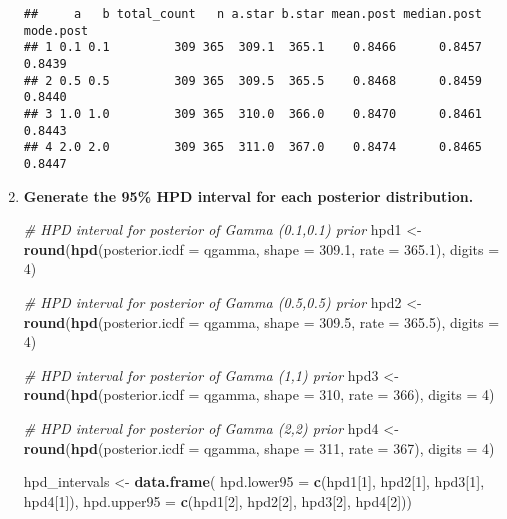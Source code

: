 \documentclass[]{article}
\newenvironment{Shaded}{\begin{snugshade}}{\end{snugshade}}
\newcommand{\AttributeTok}[1]{\textcolor[rgb]{0.13,0.29,0.53}{#1}}
\newcommand{\CommentTok}[1]{\textcolor[rgb]{0.56,0.35,0.01}{\textit{#1}}}
\newcommand{\DecValTok}[1]{\textcolor[rgb]{0.00,0.00,0.81}{#1}}
\newcommand{\FloatTok}[1]{\textcolor[rgb]{0.00,0.00,0.81}{#1}}
\newcommand{\FunctionTok}[1]{\textcolor[rgb]{0.13,0.29,0.53}{\textbf{#1}}}
\newcommand{\NormalTok}[1]{#1}
\newcommand{\OtherTok}[1]{\textcolor[rgb]{0.56,0.35,0.01}{#1}}
\begin{document}
\begin{enumerate}
\begin{verbatim}
##     a   b total_count   n a.star b.star mean.post median.post mode.post
## 1 0.1 0.1         309 365  309.1  365.1    0.8466      0.8457    0.8439
## 2 0.5 0.5         309 365  309.5  365.5    0.8468      0.8459    0.8440
## 3 1.0 1.0         309 365  310.0  366.0    0.8470      0.8461    0.8443
## 4 2.0 2.0         309 365  311.0  367.0    0.8474      0.8465    0.8447
\end{verbatim}

\hfill

\item \textbf{Generate the 95\% HPD interval for each posterior distribution.}

\begin{Shaded}
\begin{Highlighting}[]
\CommentTok{\# HPD interval for posterior of Gamma (0.1,0.1) prior}
\NormalTok{hpd1 }\OtherTok{\textless{}{-}} \FunctionTok{round}\NormalTok{(}\FunctionTok{hpd}\NormalTok{(}\AttributeTok{posterior.icdf =}\NormalTok{ qgamma, }\AttributeTok{shape =} \FloatTok{309.1}\NormalTok{, }\AttributeTok{rate =} \FloatTok{365.1}\NormalTok{), }
    \AttributeTok{digits =} \DecValTok{4}\NormalTok{)}

\CommentTok{\# HPD interval for posterior of Gamma (0.5,0.5) prior}
\NormalTok{hpd2 }\OtherTok{\textless{}{-}} \FunctionTok{round}\NormalTok{(}\FunctionTok{hpd}\NormalTok{(}\AttributeTok{posterior.icdf =}\NormalTok{ qgamma, }\AttributeTok{shape =} \FloatTok{309.5}\NormalTok{, }\AttributeTok{rate =} \FloatTok{365.5}\NormalTok{), }
    \AttributeTok{digits =} \DecValTok{4}\NormalTok{)}

\CommentTok{\# HPD interval for posterior of Gamma (1,1) prior}
\NormalTok{hpd3 }\OtherTok{\textless{}{-}} \FunctionTok{round}\NormalTok{(}\FunctionTok{hpd}\NormalTok{(}\AttributeTok{posterior.icdf =}\NormalTok{ qgamma, }\AttributeTok{shape =} \DecValTok{310}\NormalTok{, }\AttributeTok{rate =} \DecValTok{366}\NormalTok{), }
    \AttributeTok{digits =} \DecValTok{4}\NormalTok{)}

\CommentTok{\# HPD interval for posterior of Gamma (2,2) prior}
\NormalTok{hpd4 }\OtherTok{\textless{}{-}} \FunctionTok{round}\NormalTok{(}\FunctionTok{hpd}\NormalTok{(}\AttributeTok{posterior.icdf =}\NormalTok{ qgamma, }\AttributeTok{shape =} \DecValTok{311}\NormalTok{, }\AttributeTok{rate =} \DecValTok{367}\NormalTok{), }
    \AttributeTok{digits =} \DecValTok{4}\NormalTok{)}

\NormalTok{hpd\_intervals }\OtherTok{\textless{}{-}} \FunctionTok{data.frame}\NormalTok{(}
  \AttributeTok{hpd.lower95 =} \FunctionTok{c}\NormalTok{(hpd1[}\DecValTok{1}\NormalTok{], hpd2[}\DecValTok{1}\NormalTok{], hpd3[}\DecValTok{1}\NormalTok{], hpd4[}\DecValTok{1}\NormalTok{]),}
  \AttributeTok{hpd.upper95 =} \FunctionTok{c}\NormalTok{(hpd1[}\DecValTok{2}\NormalTok{], hpd2[}\DecValTok{2}\NormalTok{], hpd3[}\DecValTok{2}\NormalTok{], hpd4[}\DecValTok{2}\NormalTok{]))}


\end{Highlighting}
\end{Shaded}
\end{enumerate}
\end{document}

